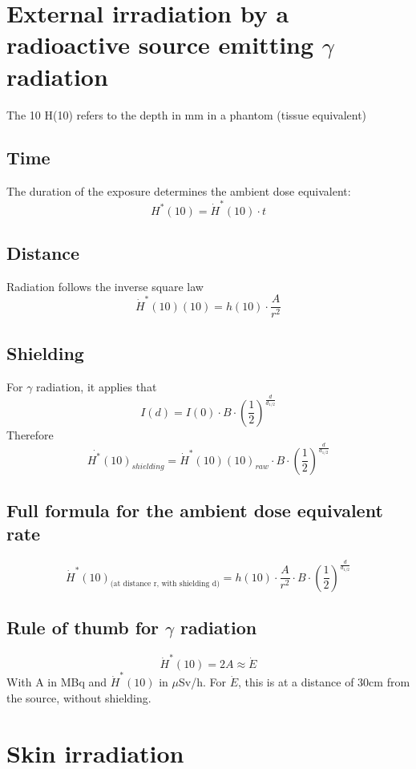\section{External irradiation by a radioactive source emitting $\gamma$ radiation}
The 10 H(10) refers to the depth in mm in a phantom (tissue equivalent)
\subsection{Time}
The duration of the exposure determines the ambient dose equivalent:
\[H^*(10)=\dot{H}^*(10)\cdot t\]
\subsection{Distance}
Radiation follows the inverse square law
\[\dot{H}^*(10)(10) = h(10)\cdot\frac{A}{r^2}\]
\subsection{Shielding}
For $\gamma$ radiation, it applies that
\[I(d) = I(0)\cdot B\cdot(\frac{1}{2})^{\frac{d}{d_{1/2}}}\]
Therefore
\[\overset{.}{H^*}(10)_{shielding} = \dot{H}^*(10)(10)_{raw} \cdot B\cdot(\frac{1}{2})^{\frac{d}{d_{1/2}}}\]
\subsection{Full formula for the ambient dose equivalent rate}
\begin{equation}
    \dot{H}^*(10)_{\text{(at distance r, with shielding d)}} = h(10) \cdot \frac{A}{r^2} \cdot B \cdot \left(\frac{1}{2}\right)^{\frac{d}{d_{1/2}}}
    \label{eq:placeholder}
\end{equation}
\subsection{Rule of thumb for $\gamma$ radiation}
\[\dot{H}^*(10) = 2A \approx \dot{E}\]
With A in MBq and $\dot{H}^*(10)$ in $\mu$Sv/h. For $\dot{E}$, this is at a distance of 30cm from the source, without shielding.
\section{Skin irradiation}

